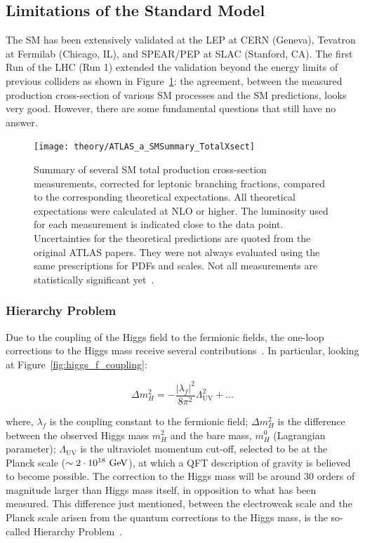 		\subsection{Limitations of the Standard Model}
		\label{sec:SMlim}

			The \ac{SM} has been extensively validated at the \ac{LEP} at CERN (Geneva), Tevatron at Fermilab (Chicago, IL), and SPEAR/PEP at SLAC (Stanford, CA). The first Run of the \acs{LHC} (Run 1) extended the validation beyond the energy limits of previous colliders as shown in Figure~\ref{fig:ATLAS_a_SMSummary_TotalXsect}: the agreement, between the measured production cross-section of various \ac{SM} processes and the \ac{SM} predictions, looks very good. However, there are some fundamental questions that still have no answer.

			\begin{figure}[!htb]
				\centering
				\texttt{[image: theory/ATLAS\_a\_SMSummary\_TotalXsect]}
				\caption{\label{fig:ATLAS_a_SMSummary_TotalXsect} Summary of several \ac{SM} total production cross-section measurements, corrected for leptonic branching fractions, compared to the corresponding theoretical expectations. All theoretical expectations were calculated at NLO or higher. The luminosity used for each measurement is indicated close to the data point. Uncertainties for the theoretical predictions are quoted from the original ATLAS papers. They were not always evaluated using the same prescriptions for PDFs and scales. Not all measurements are statistically significant yet~\cite{ATLAS_a_SMSummary_TotalXsect}.}
			\end{figure}



		\subsubsection*{Hierarchy Problem}

			Due to the coupling of the Higgs field to the fermionic fields, the one-loop corrections to the Higgs mass receive several contributions~\cite{Weinberg1976}. In particular, looking at Figure~\ref{fig:higgs_f_coupling}: 

			\begin{equation}
				\label{eq:mH_fermionic_contribution}
				\Delta m_H^2 = - \frac{ | \lambda_f  |^2}{8 \pi ^2} \Lambda_{\mathrm{UV}}^2 + \dots 
			\end{equation}
 	
			\noindent where, $\lambda_f$ is the coupling constant to the fermionic field; $\Delta m_H^2$ is the difference between the observed Higgs mass $m_H^2$ and the bare mass, $m_H^0$ (Lagrangian parameter); $\Lambda_{\mathrm{UV}}$ is the ultraviolet momentum cut-off, selected to be at the Planck scale ($\sim 2 \cdot 10^{18} \gev$), at which a \ac{QFT} description of gravity is believed to become possible. The correction to the Higgs mass will be around 30 orders of magnitude larger than Higgs mass itself, in opposition to what has been measured. This difference just mentioned, between the electroweak scale and the Planck scale arisen from the quantum corrections to the Higgs mass, is the so-called Hierarchy Problem~\cite{Weinberg1976}.

